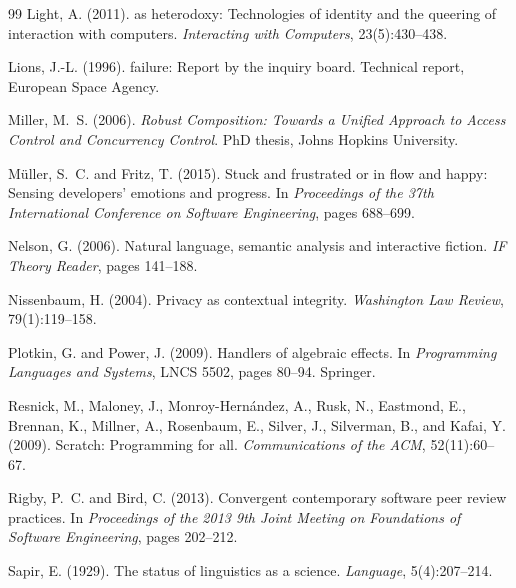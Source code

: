 \documentclass[11pt,a4paper]{article}
\begin{document}
\begin{thebibliography}{99}
Light, A. (2011).
 as heterodoxy: Technologies of identity and the queering of
  interaction with computers.
\newblock \emph{Interacting with Computers}, 23(5):430--438.

Lions, J.-L. (1996).
 failure: Report by the inquiry board.
\newblock Technical report, European Space Agency.

Miller, M.~S. (2006).
\newblock \emph{Robust Composition: Towards a Unified Approach to Access
  Control and Concurrency Control}.
\newblock PhD thesis, Johns Hopkins University.

M{\"u}ller, S.~C. and Fritz, T. (2015).
\newblock Stuck and frustrated or in flow and happy: Sensing developers'
  emotions and progress.
\newblock In \emph{Proceedings of the 37th International Conference on Software
  Engineering}, pages 688--699.

Nelson, G. (2006).
\newblock Natural language, semantic analysis and interactive fiction.
\newblock \emph{IF Theory Reader}, pages 141--188.

Nissenbaum, H. (2004).
\newblock Privacy as contextual integrity.
\newblock \emph{Washington Law Review}, 79(1):119--158.

Plotkin, G. and Power, J. (2009).
\newblock Handlers of algebraic effects.
\newblock In \emph{Programming Languages and Systems}, LNCS 5502, pages
  80--94. Springer.

Resnick, M., Maloney, J., Monroy-Hern{\'a}ndez, A., Rusk, N., Eastmond, E.,
  Brennan, K., Millner, A., Rosenbaum, E., Silver, J., Silverman, B., and
  Kafai, Y. (2009).
\newblock Scratch: Programming for all.
\newblock \emph{Communications of the ACM}, 52(11):60--67.

Rigby, P.~C. and Bird, C. (2013).
\newblock Convergent contemporary software peer review practices.
\newblock In \emph{Proceedings of the 2013 9th Joint Meeting on Foundations of
  Software Engineering}, pages 202--212.

Sapir, E. (1929).
\newblock The status of linguistics as a science.
\newblock \emph{Language}, 5(4):207--214.


\end{thebibliography}
\end{document}
